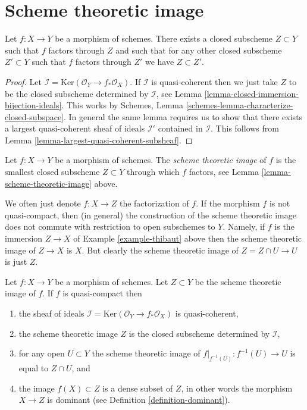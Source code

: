 \section{Scheme theoretic image}
\label{section-scheme-theoretic-image}

\begin{lemma}
\label{lemma-scheme-theoretic-image}
Let $f : X \to Y$ be a morphism of schemes. There exists a closed
subscheme $Z \subset Y$ such that $f$ factors through $Z$ and such
that for any other closed subscheme $Z' \subset Y$ such that $f$
factors through $Z'$ we have $Z \subset Z'$.
\end{lemma}

\begin{proof}
Let $\mathcal{I} = \text{Ker}(\mathcal{O}_Y \to f_*\mathcal{O}_X)$.
If $\mathcal{I}$ is quasi-coherent then we just take $Z$ to be the
closed subscheme determined by $\mathcal{I}$, see
Lemma \ref{lemma-closed-immersion-bijection-ideals}. This works by
Schemes, Lemma \ref{schemes-lemma-characterize-closed-subspace}.
In general the same lemma requires us to show that there exists
a largest quasi-coherent sheaf of ideals $\mathcal{I}'$ contained in
$\mathcal{I}$.
This follows from Lemma \ref{lemma-largest-quasi-coherent-subsheaf}.
\end{proof}

\begin{definition}
\label{definition-scheme-theoretic-image}
Let $f : X \to Y$ be a morphism of schemes. The {\it scheme theoretic image}
of $f$ is the smallest closed subscheme $Z \subset Y$ through which $f$
factors, see Lemma \ref{lemma-scheme-theoretic-image} above.
\end{definition}

\noindent
We often just denote $f : X \to Z$ the factorization of $f$.
If the morphism $f$ is not quasi-compact, then (in general) the
construction of the scheme theoretic image does not commute with
restriction to open subschemes to $Y$. Namely, if $f$ is the
immersion $Z \to X$ of Example \ref{example-thibaut} above then
the scheme theoretic image of $Z \to X$ is $X$. But clearly the
scheme theoretic image of $Z = Z \cap U \to U$ is just $Z$.

\begin{lemma}
\label{lemma-quasi-compact-scheme-theoretic-image}
Let $f : X \to Y$ be a morphism of schemes.
Let $Z \subset Y$ be the scheme theoretic image of $f$.
If $f$ is quasi-compact then
\begin{enumerate}
\item the sheaf of ideals
$\mathcal{I} = \text{Ker}(\mathcal{O}_Y \to f_*\mathcal{O}_X)$
is quasi-coherent,
\item the scheme theoretic image $Z$ is the closed subscheme
determined by $\mathcal{I}$,
\item for any open $U \subset Y$ the scheme theoretic image of
$f|_{f^{-1}(U)} : f^{-1}(U) \to U$ is equal to $Z \cap U$, and
\item the image $f(X) \subset Z$ is a dense subset of $Z$, in other
words the morphism $X \to Z$ is dominant
(see Definition \ref{definition-dominant}).
\end{enumerate}
\end{lemma}

